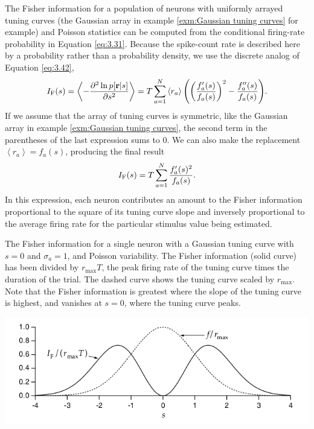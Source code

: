 \begin{exm}
  The Fisher information for a population of neurons with uniformly
  arrayed tuning curves (the Gaussian array in example \ref{exm:Gaussian tuning curves} for example) and
Poisson statistics can be computed from the conditional firing-rate probability in Equation \ref{eq:3.31}. Because the spike-count rate is
described here by a probability rather than a probability density, we
use the discrete analog of Equation \ref{eq:3.42},
\begin{equation}
  \label{eq:3.44}
  I_{\rm{F}}(s)=\left\langle
    -\frac{\partial^{2}\ln p[\mathbf{r}|s]}{\partial s^{2}}
  \right\rangle=T\sum\limits_{a=1}\limits^N {\left\langle r_{a} \right\rangle{\left(\left( \frac{f_a'(s)}{f_a(s)} \right)^{2}-\frac{f_a''(s)}{f_a(s)}\right)}}.
  \end{equation}
If we assume that the array of tuning curves is symmetric, like the Gaussian array in example \ref{exm:Gaussian tuning curves}, the second term
in the parentheses of the last expression sums to $0$. We can also
make the replacement $\left\langle r_{a}
\right\rangle=f_a(s)$, producing the final result
\begin{equation}
  \label{eq:3.45}
  I_{\rm{F}}(s)=T\sum\limits_{a=1}\limits^N \frac{f_a'(s)^{2}}{f_a(s)}.
\end{equation}
In this expression, each neuron contributes an amount to the Fisher
information proportional to the square of its tuning curve slope and inversely
proportional to the average firing rate for the particular stimulus value being estimated.
\end{exm}

\begin{exm}
  The Fisher information for a single neuron with a Gaussian tuning
curve with $s=0$ and $\sigma_a=1$, and Poisson variability. The Fisher information (solid
curve) has been divided by $r_{\max}T$, the peak firing rate of the tuning curve times
the duration of the trial. The dashed curve shows the tuning curve scaled by $r_{\max}$.
Note that the Fisher information is greatest where the slope of the tuning curve is
highest, and vanishes at $s=0$, where the tuning curve peaks.

\begin{center}
  \includegraphics[scale = 0.4]{./png/3-11}
\end{center}
\end{exm}

